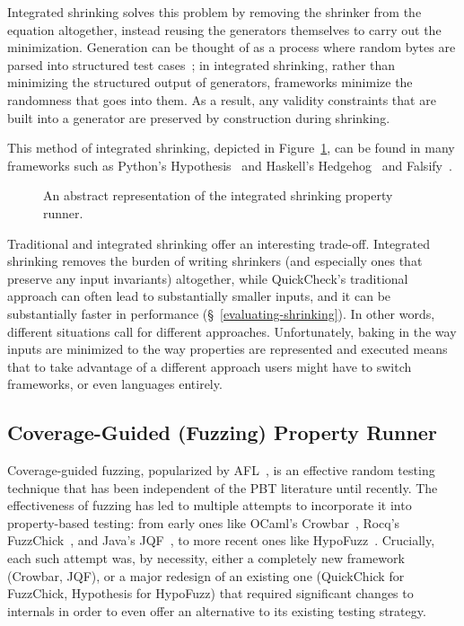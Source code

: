 Integrated shrinking solves this problem by removing the shrinker from the equation
altogether, instead reusing the generators themselves to carry out the minimization.
Generation can be thought of as a process where random bytes are parsed into structured
test cases~\cite{goldsteinParsingRandomness2022}; in integrated shrinking, rather than
minimizing the structured output of generators, frameworks minimize the randomness that
goes into them. As a result, any validity constraints that are built into a generator
are preserved by construction during shrinking.

This method of integrated shrinking, depicted in
Figure~\ref{fig:rackcheck-property-runner}, can be found in many frameworks such as
Python's Hypothesis~\cite{HypothesisShrinking} and Haskell's Hedgehog~\cite{Hedgehog}
and Falsify~\cite{falsifyLeo2023}.

\begin{figure}[h!]
  \centering
  \resizebox{0.95\linewidth}{!}{}
  \caption{An abstract representation of the integrated shrinking property runner.}
  \label{fig:rackcheck-property-runner}
\end{figure}

Traditional and integrated shrinking offer an interesting trade-off. Integrated
shrinking removes the burden of writing shrinkers (and especially ones that preserve
any input invariants) altogether, while QuickCheck's traditional approach can often
lead to substantially smaller inputs, and it can be substantially faster in performance
(\S~\ref{evaluating-shrinking}). In other words, different situations call for
different approaches. Unfortunately, baking in the way inputs are minimized to the way
properties are represented and executed means that to take advantage of a different
approach users might have to switch frameworks, or even languages entirely.

\subsection{Coverage-Guided (Fuzzing) Property Runner}\label{sec:loops:cgpr}

Coverage-guided fuzzing, popularized by AFL~\cite{aflplusplus}, is an effective random
testing technique that has been independent of the PBT literature until recently. The
effectiveness of fuzzing has led to multiple attempts to incorporate it into
property-based testing: from early ones like OCaml's Crowbar~\cite{Crowbar}, Rocq's
FuzzChick~\cite{FuzzChick}, and Java's JQF~\cite{Padye2019}, to more recent ones like
HypoFuzz~\cite{HypoFuzz}. Crucially, each such attempt was, by necessity, either a
completely new framework (Crowbar, JQF), or a major redesign of an existing one
(QuickChick for FuzzChick, Hypothesis for HypoFuzz) that required significant changes
to internals in order to even offer an alternative to its existing testing strategy.

